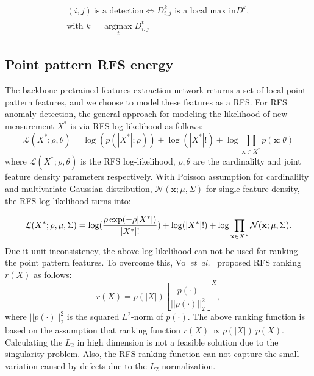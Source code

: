 \documentclass[journal]{IEEEtran}
\newcommand \argmax {\operatorname*{argmax}}
\newcommand \andothers {\textit{et~al.}}
\begin{document}
\begin{equation}
\begin{split}
(i,j)~\text{is a detection} \Leftrightarrow D^k_{i,j} \text{~is a local max in} D^k,\\
\text{with~} k=\argmax_{t}  D^t_{i,j}
\end{split}
\end{equation}

\subsection{Point pattern RFS energy}
The backbone pretrained features extraction network returns a set of local point pattern features, and we choose to model these features as a RFS. For RFS anomaly detection, the general approach for modeling the likelihood of new measurement $X^*$ is via RFS log-likelihood as follows:
\begin{equation}
\mathcal{L}(X^*;\rho,\theta)=\log(p(|X^*|;\rho))+\log(|X^*|!)+\log\prod_{\mathbf{x}\in X^*} p(\mathbf{x};\theta)
\label{RFS+Pos_log_like}
\end{equation}
where $\mathcal{L}(X^*;\rho,\theta)$ is the RFS log-likelihood, $\rho,\theta$ are the cardinalilty and joint feature density parameters respectively. With Poisson assumption for cardinalilty and multivariate Gaussian distribution, $\mathcal{N}(\mathbf{x};\mu,\Sigma)$ for single feature density, the RFS log-likelihood turns into:

\begin{equation}
\mathcal{L}(X^*;\rho,\mu,\Sigma)=\log(\frac{\rho\exp(-\rho|X^*|)}{|X^*|!})+\log(|X^*|!) \\
+\log\prod_{\mathbf{x}\in X^*} \mathcal{N}(\mathbf{x};\mu,\Sigma).
\end{equation}
Due it unit inconsistency, the above log-likelihood can not be used for ranking the point pattern features. To overcome this, Vo~\andothers~\cite{Vo2018} proposed RFS ranking $r(X)$ as follows:
\begin{equation}
\label{eq:rankrfs}
r(X)= p(|X|) \left[\frac{p(\cdot)}{||p(\cdot)||_2^2}\right] ^X,
\end{equation}
where $||p(\cdot)||_2^2$ is the squared $L^2$-norm of $p(\cdot)$. The above ranking function is based on the assumption that ranking function $r(X)~\propto p(|X|)~p(X)$. Calculating the $L_2$ in high dimension is not a feasible solution due to the singularity problem. Also, the RFS ranking function can not capture the small variation caused by defects due to the $L_2$ normalization.
\end{document}
